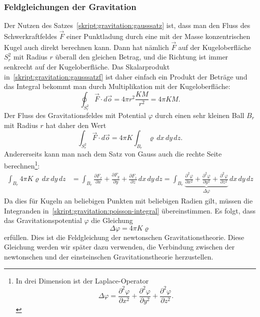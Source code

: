 \subsubsection{Feldgleichungen der Gravitation}
%
%
Der Nutzen des Satzes~\ref{skript:gravitation:gausssatz}
ist, dass man den Fluss des Schwerkraftfeldes
$\vec F$ einer Punktladung durch eine mit der Masse konzentrischen
Kugel auch direkt berechnen kann.
Dann hat nämlich $\vec F$ auf der Kugeloberfläche $S^2_r$ mit
Radius $r$ überall den gleichen
Betrag, und die Richtung ist immer senkrecht auf der Kugeloberfläche.
Das Skalarprodukt in~\eqref{skript:gravitation:gausssatzf} ist daher
einfach ein Produkt der Beträge und das Integral bekommt man durch
Multiplikation mit der Kugeloberfläche:
\[
\oint_{S^2_r} \vec F\cdot d\vec o
=
4\pi r^2
\frac{KM}{r^2}
=
4\pi KM.
\]
Der Fluss des Gravitationsfeldes mit Potential $\varphi$ durch einen
sehr kleinen Ball $B_r$ mit Radius $r$ hat daher den Wert
\[
\int_{S^2_r}\vec F\cdot d\vec o
=
4\pi K\int_{B_r} \varrho\,dx\,dy\,dz.
\]
Andererseits kann man nach dem Satz von Gauss auch die rechte 
Seite berechnen\footnote{
In drei Dimension ist der Laplace-Operator
\[
\Delta \varphi
=
\frac{\partial^2 \varphi}{\partial x^2}
+
\frac{\partial^2 \varphi}{\partial y^2}
+
\frac{\partial^2 \varphi}{\partial z^2}.
\]}:
\begin{align}
\int_{B_r} 4\pi K\varrho\,dx\,dy\,dz
&=
\int_{B_r}
\frac{\partial F_x}{\partial x}+
\frac{\partial F_y}{\partial y}+
\frac{\partial F_z}{\partial z}
\,dx\,dy\,dz
=
\int_{B_r}
\underbrace{
\frac{\partial^2\varphi}{\partial x^2}+
\frac{\partial^2\varphi}{\partial y^2}+
\frac{\partial^2\varphi}{\partial z^2}}_{\displaystyle \Delta \varphi}
\,dx\,dy\,dz
\label{skript:gravitation:poisson-integral}
\end{align}
Da dies für Kugeln an beliebigen Punkten mit beliebigen Radien 
gilt, müssen die Integranden in~\eqref{skript:gravitation:poisson-integral}
übereinstimmen.
Es folgt, dass das Gravitationspotential $\varphi$ die Gleichung
\begin{equation}
\Delta \varphi = 4\pi K\varrho
\label{skript:gravitation:potentialgleichung}
\end{equation}
erfüllen.
Dies ist die Feldgleichung der newtonschen Gravitationstheorie.
Diese Gleichung werden wir später dazu verwenden, die Verbindung zwischen
der newtonschen und der einsteinschen Gravitationstheorie herzustellen.

